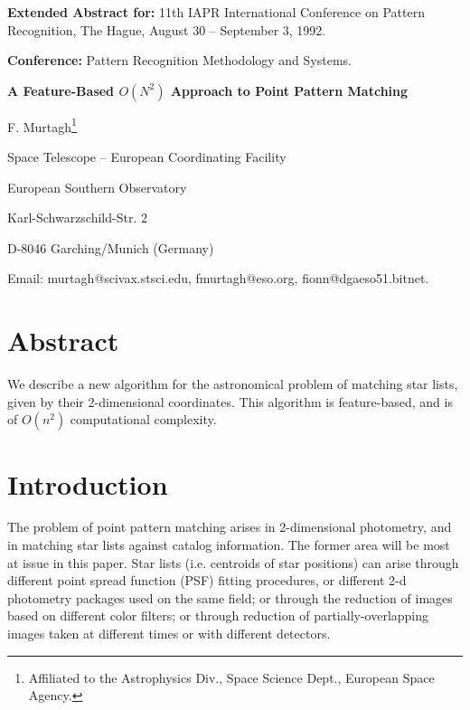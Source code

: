 \pagestyle{empty}


{\bf Extended Abstract for:} 11th IAPR International 
Conference on Pattern Recognition,
The Hague, August 30 -- September 3, 1992.

\medskip

{\bf Conference:} Pattern Recognition Methodology and Systems.

\bigskip

\bigskip

\bigskip

\begin{center}
{\large{\bf A Feature-Based $O(N^2)$ Approach to Point Pattern Matching}}

\bigskip

F. Murtagh\footnote{Affiliated to the Astrophysics Div., Space Science Dept.,
European Space Agency.}

Space Telescope -- European Coordinating Facility

European Southern Observatory 

Karl-Schwarzschild-Str. 2

D-8046 Garching/Munich (Germany)

Email: murtagh@scivax.stsci.edu, fmurtagh@eso.org, fionn@dgaeso51.bitnet.

\end{center}

\section*{Abstract}

We describe a new algorithm for the astronomical problem of matching star 
lists, given by their 
2-dimensional coordinates.  This algorithm is feature-based, and is of
$O(n^2)$ computational complexity.

\section{Introduction}

The problem of point pattern matching arises in 2-dimensional photometry,
and in matching star lists against catalog information.  The former area
will be most at issue in this paper.  Star lists (i.e. centroids of
star positions) can arise through different point spread function (PSF) 
fitting procedures, or 
different 2-d photometry packages used on the same field; or through 
the reduction of images based on different color filters; 
or through reduction of partially-overlapping images taken at different
times or with different detectors.

